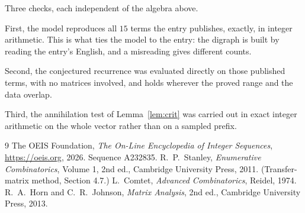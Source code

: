 \documentclass[11pt,a4paper]{article}
\theoremstyle{plain}
\theoremstyle{definition}
\begin{document}
Three checks, each independent of the algebra above.

First, the model reproduces all $15$ terms the entry publishes, exactly, in integer
arithmetic. This is what ties the model to the entry: the digraph is built by reading the
entry's English, and a misreading gives different counts.

Second, the conjectured recurrence was evaluated directly on those published terms, with no
matrices involved, and holds wherever the proved range and the data overlap.

Third, the annihilation test of Lemma~\ref{lem:crit} was carried out in exact integer
arithmetic on the whole vector rather than on a sampled prefix.

\begin{thebibliography}{9}
 The OEIS Foundation, \emph{The On-Line Encyclopedia of Integer
Sequences}, \url{https://oeis.org}, 2026. Sequence A232835.
 R.~P.~Stanley, \emph{Enumerative Combinatorics}, Volume 1, 2nd ed.,
Cambridge University Press, 2011. (Transfer-matrix method, Section 4.7.)
 L.~Comtet, \emph{Advanced Combinatorics}, Reidel, 1974.
 R.~A.~Horn and C.~R.~Johnson, \emph{Matrix Analysis}, 2nd ed., Cambridge
University Press, 2013.
\end{thebibliography}
\end{document}
